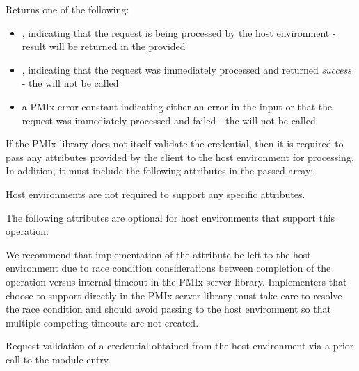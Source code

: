 Returns one of the following:

\begin{itemize}
    \item {}, indicating that the request is being processed by the host environment - result will be returned in the provided 
    \item {}, indicating that the request was immediately processed and returned \textit{success} - the  will not be called
    \item a PMIx error constant indicating either an error in the input or that the request was immediately processed and failed - the  will not be called
\end{itemize}

\reqattrstart
If the \ac{PMIx} library does not itself validate the credential, then it is required to pass any attributes provided by the client to the host environment for processing. In addition, it must include the following attributes in the passed  array:


\divider

Host environments are not required to support any specific attributes.

\reqattrend

\optattrstart
The following attributes are optional for host environments that support this operation:


\optattrend

\adviceimplstart
We recommend that implementation of the  attribute be left to the host environment due to race condition considerations between completion of the operation versus internal timeout in the \ac{PMIx} server library. Implementers that choose to support  directly in the \ac{PMIx} server library must take care to resolve the race condition and should avoid passing  to the host environment so that multiple competing timeouts are not created.
\adviceimplend


\descr

Request validation of a credential obtained from the host environment via a prior call to the  module entry.

\subsection{}

